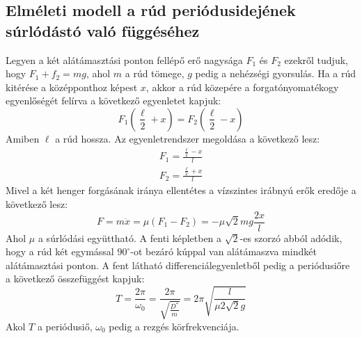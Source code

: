 \documentclass[10pt,pdftex]{report}
\begin{document}
\subsection*{Elméleti modell a rúd periódusidejének súrlódástó való függéséhez}
Legyen a két alátámasztási ponton fellépő erő nagysága $F_1$ és $F_2$ ezekről tudjuk,\\ hogy $F_1+f_2=mg$, ahol $m$ a rúd tömege, $g$ pedig a nehézségi gyorsulás. 
Ha a rúd kitérése a középponthoz képest $x$, akkor a rúd közepére a forgatónyomatékogy egyenlőségét felírva a következő egyenletet kapjuk:
\begin{equation*}
    F_1\left(\frac{\ell}{2}+x\right)=F_2\left(\frac{\ell}{2}-x\right)
\end{equation*}
Amiben $\ell$ a rúd hossza. Az egyenletrendszer megoldása a következő lesz:
\begin{eqnarray*}
    F_1=\frac{\frac{\ell}{2}-x}{l}\\
    F_2=\frac{\frac{\ell}{2}+x}{l}
\end{eqnarray*}
Mivel a két henger forgásának iránya ellentétes a vízszintes irábnyú erők eredője a következő lesz:
\begin{equation*}
    F=m\ddot{x}=\mu\left(F_1-F_2\right)=-\mu\sqrt{2}mg\frac{2x}{l}
\end{equation*}
Ahol $\mu$ a súrlódási együttható. A fenti képletben a $\sqrt{2}$-es szorzó abból adódik, hogy a rúd két egymással $90^{\circ}$-ot bezáró kúppal van alátámaszva mindkét 
alátámasztási ponton. A fent látható differenciálegyenletből pedig a periódusiőre a következő összefüggést kapjuk:
\begin{equation*}
    T=\frac{2\pi}{\omega_0}=\frac{2\pi}{\sqrt{\frac{D^*}{m}}}=2\pi\sqrt{\frac{l}{\mu 2\sqrt{2}g}}
\end{equation*}
Akol $T$ a periódusiő, $\omega_0$ pedig a rezgés körfrekvenciája.
\end{document}
